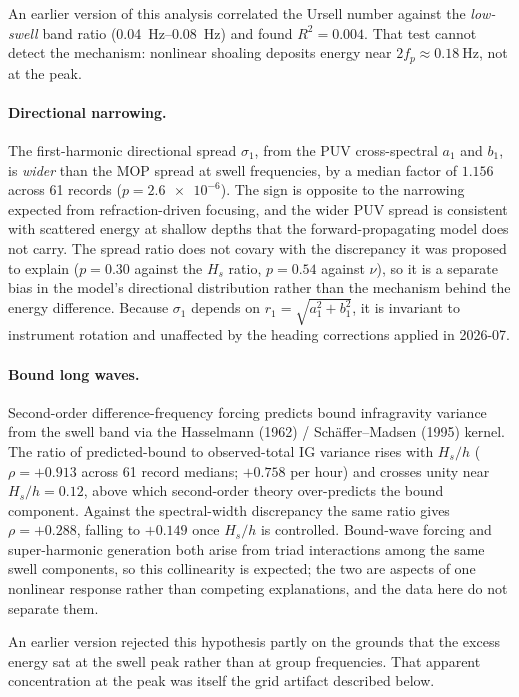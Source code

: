 An earlier version of this analysis correlated the Ursell number against the
\emph{low-swell} band ratio (\SIrange{0.04}{0.08}{\hertz}) and found
$R^2 = 0.004$. That test cannot detect the mechanism: nonlinear shoaling deposits
energy near $2f_p \approx \SI{0.18}{\hertz}$, not at the peak.

\paragraph{Directional narrowing.}
The first-harmonic directional spread $\sigma_1$, from the PUV cross-spectral
$a_1$ and $b_1$, is \emph{wider} than the MOP spread at swell frequencies, by a
median factor of $1.156$ across 61 records ($p = \num{2.6e-6}$). The sign is
opposite to the narrowing expected from refraction-driven focusing, and the
wider PUV spread is consistent with scattered energy at shallow depths that the
forward-propagating model does not carry. The spread ratio does not covary with
the discrepancy it was proposed to explain ($p = 0.30$ against the $H_s$ ratio,
$p = 0.54$ against $\nu$), so it is a separate bias in the model's directional
distribution rather than the mechanism behind the energy difference. Because
$\sigma_1$ depends on $r_1 = \sqrt{a_1^2 + b_1^2}$, it is invariant to
instrument rotation and unaffected by the heading corrections applied in 2026-07.

\paragraph{Bound long waves.}
Second-order difference-frequency forcing predicts bound infragravity variance
from the swell band via the Hasselmann (1962) / Sch\"affer--Madsen (1995) kernel.
The ratio of predicted-bound to observed-total IG variance rises with $H_s/h$
($\rho = +0.913$ across 61 record medians; $+0.758$ per hour) and crosses unity
near $H_s/h = 0.12$, above which second-order theory over-predicts the bound
component. Against the spectral-width discrepancy the same ratio gives
$\rho = +0.288$, falling to $+0.149$ once $H_s/h$ is controlled. Bound-wave
forcing and super-harmonic generation both arise from triad interactions among
the same swell components, so this collinearity is expected; the two are aspects
of one nonlinear response rather than competing explanations, and the data here
do not separate them.

An earlier version rejected this hypothesis partly on the grounds that the excess
energy sat at the swell peak rather than at group frequencies. That apparent
concentration at the peak was itself the grid artifact described below.

